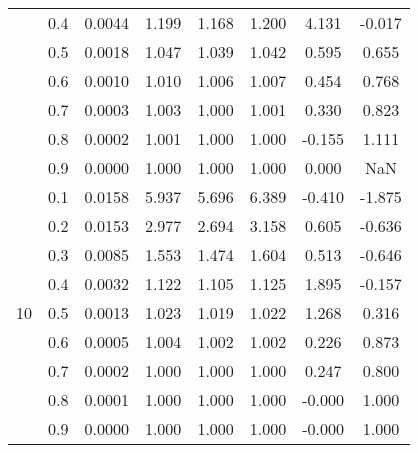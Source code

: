 \documentclass[11pt,a4paper]{report}
\begin{document}
\begin{longtable}{ | c | c || c | c | c | c | c | c | }
 & 0.4 & 0.0044 & 1.199 & 1.168 & 1.200 & 4.131 & -0.017 \\
 & 0.5 & 0.0018 & 1.047 & 1.039 & 1.042 & 0.595 & 0.655 \\
 & 0.6 & 0.0010 & 1.010 & 1.006 & 1.007 & 0.454 & 0.768 \\
 & 0.7 & 0.0003 & 1.003 & 1.000 & 1.001 & 0.330 & 0.823 \\
 & 0.8 & 0.0002 & 1.001 & 1.000 & 1.000 & -0.155 & 1.111 \\
 & 0.9 & 0.0000 & 1.000 & 1.000 & 1.000 & 0.000 & NaN \\
 \hline
\multirow{9}{*}{10} & 0.1 & 0.0158 & 5.937 & 5.696 & 6.389 & -0.410 & -1.875 \\
 & 0.2 & 0.0153 & 2.977 & 2.694 & 3.158 & 0.605 & -0.636 \\
 & 0.3 & 0.0085 & 1.553 & 1.474 & 1.604 & 0.513 & -0.646 \\
 & 0.4 & 0.0032 & 1.122 & 1.105 & 1.125 & 1.895 & -0.157 \\
 & 0.5 & 0.0013 & 1.023 & 1.019 & 1.022 & 1.268 & 0.316 \\
 & 0.6 & 0.0005 & 1.004 & 1.002 & 1.002 & 0.226 & 0.873 \\
 & 0.7 & 0.0002 & 1.000 & 1.000 & 1.000 & 0.247 & 0.800 \\
 & 0.8 & 0.0001 & 1.000 & 1.000 & 1.000 & -0.000 & 1.000 \\
 & 0.9 & 0.0000 & 1.000 & 1.000 & 1.000 & -0.000 & 1.000 \\
 \hline
\hline
\end{longtable}
\end{document}

